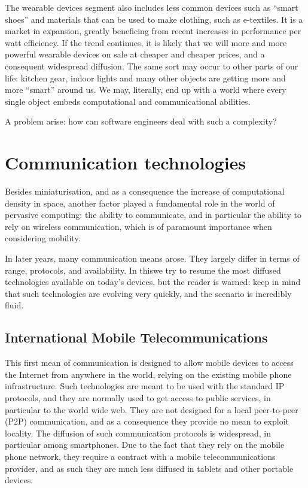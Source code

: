 \documentclass[12pt,a4paper,twoside,openright]{book}
\begin{document}
The wearable devices segment also includes less common devices such as ``smart shoes'' and materials that can be used to make clothing, such as e-textiles.
%
It is a market in expansion, greatly beneficing from recent increases in performance per watt efficiency.
%
If the trend continues, it is likely that we will more and more powerful wearable devices on sale at cheaper and cheaper prices, and a consequent widespread diffusion.
%
The same sort may occur to other parts of our life: kitchen gear, indoor lights and many other objects are getting more and more ``smart'' around us.
%
We may, literally, end up with a world where every single object embeds computational and communicational abilities.

A problem arise: how can software engineers deal with such a complexity?

\section{Communication technologies}

Besides miniaturisation, and as a consequence the increase of computational density in space, another factor played a fundamental role in the world of pervasive computing: the ability to communicate, and in particular the ability to rely on wireless communication, which is of paramount importance when considering mobility.

In later years, many communication means arose.
%
They largely differ in terms of range, protocols, and availability.
%
In this\levelText{}we try to resume the most diffused technologies available on today's devices, but the reader is warned: keep in mind that such technologies are evolving very quickly, and the scenario is incredibly fluid.

\subsection{International Mobile Telecommunications}
\label{International Mobile Telecommunications}

This first mean of communication is designed to allow mobile devices to access the Internet from anywhere in the world, relying on the existing mobile phone infrastructure.
%
Such technologies are meant to be used with the standard IP protocols, and they are normally used to get access to public services, in particular to the world wide web.
%
They are not designed for a local peer-to-peer (P2P) communication, and as a consequence they provide no mean to exploit locality.
%
The diffusion of such communication protocols is widespread, in particular among smartphones.
%
Due to the fact that they rely on the mobile phone network, they require a contract with a mobile telecommunications provider, and as such they are much less diffused in tablets and other portable devices.
\end{document}
